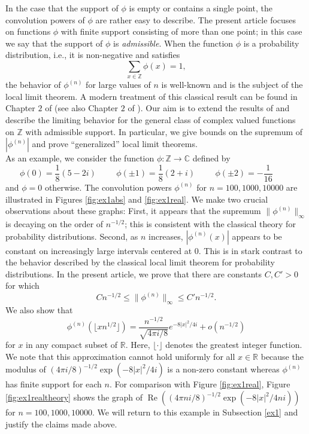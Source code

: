 \documentclass{article}
\theoremstyle{theorem}
\theoremstyle{remark}
\renewcommand\Re{\operatorname{Re}}%
\begin{document}
\noindent In the case that the support of $\phi$ is empty or
contains a single point, the convolution powers of $\phi$ are rather easy to
describe. The present article focuses on functions $\phi$ with finite
support consisting of more than one point; in this case we say
that the support of $\phi$ is \textit{admissible}. When the function $\phi$ is a probability distribution, i.e., it is
non-negative and satisfies
\begin{equation*}
\sum_{x\in\mathbb{Z}}\phi(x)=1,
\end{equation*}
the behavior of $\phi^{(n)}$ for large values of $n$ is well-known and is the subject of the local limit theorem. A modern treatment of this classical result can be found in Chapter $2$ of \cite{LL} (see also Chapter $2$ of \cite{FS}).  Our aim is to extend the results of \cite{DSC1} and describe the limiting behavior for the
general class of complex valued functions on $\mathbb{Z}$ with admissible
support. In particular, we give bounds on the supremum of $|\phi^{(n)}|$
and prove ``generalized'' local limit theorems.\\
 
\noindent As an example, we consider the function $\phi:\mathbb{Z}\rightarrow \mathbb{C}$ defined by
\begin{equation}\label{ex1def}
 \phi(0)=\frac{1}{8}(5-2i)\hspace{1cm}\phi(\pm 1)=\frac{1}{8}(2+i)\hspace{1cm}\phi(\pm 2)=-\frac{1}{16}\hspace{1cm}
\end{equation}
and $\phi=0$ otherwise. The convolution powers $\phi^{(n)}$ for $n=100,1000,10000$ are illustrated in Figures \ref{fig:ex1abs} and \ref{fig:ex1real}. We make two crucial observations about these graphs: First, it appears that the supremum $\|\phi^{(n)}\|_{\infty}$ is decaying on the order of $n^{-1/2}$; this is consistent with the classical theory for probability distributions. Second, as $n$ increases, $|\phi^{(n)}(x)|$ appears to be constant on increasingly large intervals centered at $0$. This is in stark contrast to the behavior described by the classical local limit theorem for probability distributions.  In the present article, we prove that there are constants $C,C'>0$ for which
\begin{equation*}
Cn^{-1/2}\leq \|\phi^{(n)}\|_{\infty}\leq C'n^{-1/2}.
\end{equation*}
We also show that
\begin{equation*}
\phi^{(n)}(\lfloor xn^{1/2}\rfloor)=\frac{n^{-1/2}}{\sqrt{4\pi
i/8}}e^{-8|x|^2/4i}+o(n^{-1/2})
\end{equation*}
for $x$ in any compact subset of $\mathbb{R}$. Here, $\lfloor \cdot\rfloor$ denotes the greatest integer function. We note that this approximation cannot hold uniformly for all $x\in\mathbb{R}$ because the modulus of $(4\pi i/8)^{-1/2}\exp(-8|x|^2/4i)$  is a non-zero constant whereas $\phi^{(n)}$ has finite support for each $n$. For comparison with Figure
\ref{fig:ex1real}, Figure \ref{fig:ex1realtheory}
shows the graph of $\Re((4\pi ni/8)^{-1/2}\exp(-8|x|^2/4ni))$ for
$n=100,1000,10000$. We will return to this example in Subsection \ref{ex1} and justify the claims made above.\\
\end{document}
